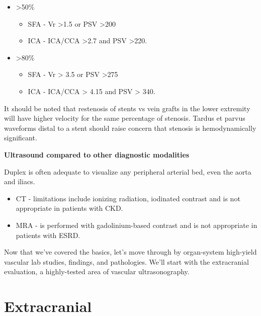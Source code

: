 \documentclass[
]{book}
\begin{document}
\begin{itemize}
\item
  \textgreater50\%

  \begin{itemize}
  \item
    SFA - Vr \textgreater1.5 or PSV \textgreater200 \citep{baril2009, kawarada2013}
  \item
    ICA - ICA/CCA \textgreater2.7 and PSV \textgreater220.\citep{lal2008}
  \end{itemize}
\item
  \textgreater80\%

  \begin{itemize}
  \item
    SFA - Vr \textgreater{} 3.5 or PSV \textgreater275 \citep{baril2009, kawarada2013}
  \item
    ICA - ICA/CCA \textgreater{} 4.15 and PSV \textgreater{} 340.\citep{lal2008}
  \end{itemize}
\end{itemize}

It should be noted that restenosis of stents vs vein grafts in the lower
extremity will have higher velocity for the same percentage of stenosis.
Tardus et parvus waveforms distal to a stent should raise concern that
stenosis is hemodynamically significant.\citep{baril2009, kawarada2013}

\textbf{Ultrasound compared to other diagnostic modalities}

Duplex is often adequate to visualize any peripheral arterial bed, even
the aorta and iliacs.\citep{muelaméndez2018}

\begin{itemize}
\item
  CT - limitations include ionizing radiation, iodinated contrast and
  is not appropriate in patients with CKD.
\item
  MRA - is performed with gadolinium-based contrast and is not
  appropriate in patients with ESRD.
\end{itemize}

Now that we've covered the basics, let's move through by organ-system
high-yield vascular lab studies, findings, and pathologies. We'll start
with the extracranial evaluation, a highly-tested area of vascular
ultrasonography.

\hypertarget{extracranial}{%
\section{Extracranial}\label{extracranial}}
\end{document}
